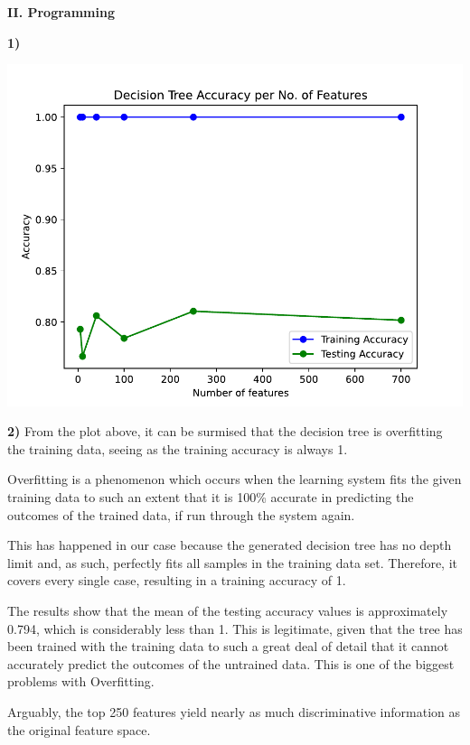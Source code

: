 \documentclass[11pt,a4paper]{article}
\begin{document}
\begin{center}
\textbf{II. Programming}
\end{center}

\begin{flushleft}
\textbf{1)} \par
\includegraphics[scale=0.75]{hw01_plot.pdf}
\end{flushleft}
\vspace*{2mm}

\begin{flushleft}
\textbf{2)}
From the plot above, it can be surmised that the decision tree is overfitting the training data, seeing as the training accuracy is always 1.

Overfitting is a phenomenon which occurs when the learning system fits the given training data to such an extent that it is 100\% accurate in predicting the outcomes of the trained data, if run through the system again.

This has happened in our case because the generated decision tree has no depth limit and, as such, perfectly fits all samples in the training data set. Therefore, it covers every single case, resulting in a training accuracy of 1.

The results show that the mean of the testing accuracy values is approximately 0.794, which is considerably less than 1. This is legitimate, given that the tree has been trained with the training data to such a great deal of detail that it cannot accurately predict the outcomes of the untrained data. This is one of the biggest problems with Overfitting.

Arguably, the top 250 features yield nearly as much discriminative information as the original feature space.
\end{flushleft}
\end{document}
